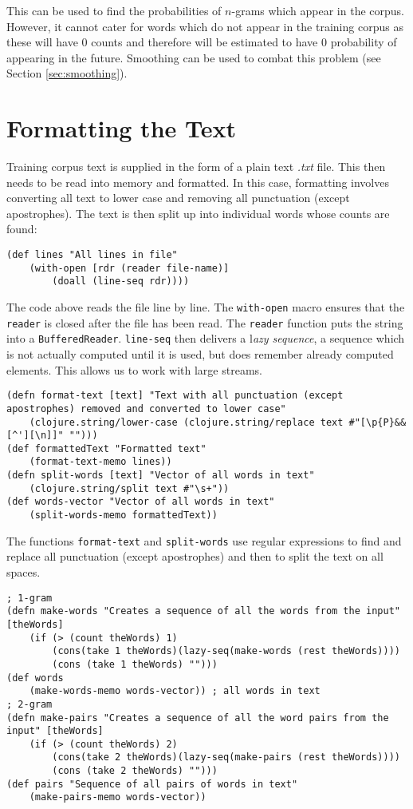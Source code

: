 \noindent This can be used to find the probabilities of $n$-grams which appear in the corpus. However, it cannot cater for words which do not appear in the training corpus as these will have 0 counts and therefore will be estimated to have 0 probability of appearing in the future. Smoothing can be used to combat this problem (see Section \ref{sec:smoothing}).

\section{Formatting the Text} \label{sec:formattingText}

Training corpus text is supplied in the form of a plain text \textit{.txt} file. This then needs to be read into memory and formatted. In this case, formatting involves converting all text to lower case and removing all punctuation (except apostrophes). The text is then split up into individual words whose counts are found:

\begin{lstlisting}
(def lines "All lines in file" 
	(with-open [rdr (reader file-name)] 
		(doall (line-seq rdr))))
\end{lstlisting}

The code above reads the file line by line. The \lstinline!with-open! macro ensures that the \lstinline!reader! is closed after the file has been read. The \lstinline!reader! function puts the string into a \lstinline!BufferedReader!. \lstinline!line-seq! then delivers a l\textit{azy sequence}, a sequence which is not actually computed until it is used, but does remember already computed elements. This allows us to work with large streams.

\begin{lstlisting}
(defn format-text [text] "Text with all punctuation (except apostrophes) removed and converted to lower case" 
	(clojure.string/lower-case (clojure.string/replace text #"[\p{P}&&[^'][\n]]" "")))
(def formattedText "Formatted text" 
	(format-text-memo lines))
(defn split-words [text] "Vector of all words in text" 
	(clojure.string/split text #"\s+"))
(def words-vector "Vector of all words in text" 
	(split-words-memo formattedText))
\end{lstlisting}

The functions \lstinline!format-text! and \lstinline!split-words! use regular expressions to find and replace all punctuation (except apostrophes) and then to split the text on all spaces. 

\begin{lstlisting}
; 1-gram
(defn make-words "Creates a sequence of all the words from the input" [theWords] 
	(if (> (count theWords) 1) 
		(cons(take 1 theWords)(lazy-seq(make-words (rest theWords)))) 
		(cons (take 1 theWords) "")))
(def words 
	(make-words-memo words-vector)) ; all words in text
; 2-gram
(defn make-pairs "Creates a sequence of all the word pairs from the input" [theWords] 
	(if (> (count theWords) 2) 
		(cons(take 2 theWords)(lazy-seq(make-pairs (rest theWords)))) 
		(cons (take 2 theWords) "")))
(def pairs "Sequence of all pairs of words in text" 
	(make-pairs-memo words-vector))
\end{lstlisting}

